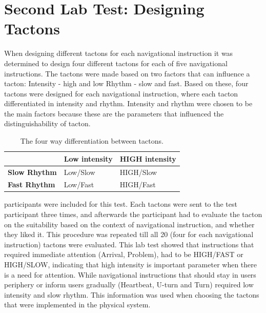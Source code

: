 \documentclass{sigchi}
\begin{document}
\section{Second Lab Test: Designing Tactons}
When designing different tactons for each navigational instruction it was determined to design four different tactons for each of five navigational instructions. The tactons were made based on two factors that can influence a tacton:\newline
Intensity - high and low 
Rhythm - slow and fast.
Based on these, four tactons were designed for each navigational instruction, where each tacton differentiated in intensity and rhythm. Intensity and rhythm were chosen to be the main factors because these are the parameters that influenced the distinguishability of tacton. 
\begin{table}
\centering
\small
\begin{tabular} {p{2.0cm}p{2.0cm}p{2.0cm}}
\toprule
 & \textbf{Low intensity} & \textbf{HIGH intensity}  
\tabularnewline 
\midrule
\textbf{Slow Rhythm} & Low/Slow & HIGH/Slow  
\vspace{0.1cm} \tabularnewline
\textbf{Fast Rhythm} & Low/Fast & HIGH/Fast 
\vspace{0.1cm} 
\tabularnewline
\bottomrule
\end{tabular}
\caption{The four way differentiation between tactons.}
\label{tab:stage_two_tacton_design}
\end{table}
\noindent
\newline
{} participants were included for this test. Each tactons were sent to the test participant three times, and afterwards the participant had to evaluate the tacton on the suitability based on the context of navigational instruction, and whether they liked it. This procedure was repeated till all 20 (four for each navigational instruction) tactons were evaluated.
\newline
\newline
This lab test showed that instructions that required immediate attention (Arrival, Problem), had to be HIGH/FAST or HIGH/SLOW, indicating that high intensity is important parameter when there is a need for attention. 
While navigational instructions that should stay in users periphery or inform users gradually (Heartbeat, U-turn and Turn) required low intensity and slow rhythm. This information was used when choosing the tactons that were implemented in the physical system.  
\end{document}
